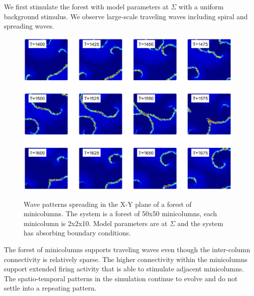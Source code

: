 We first stimulate the forest with model parameters at $\Sigma$ with a uniform background stimulus. 
We observe large-scale traveling waves including spiral and spreading waves.
\begin{figure}[!htb]
 \caption{ Wave patterns spreading in the X-Y plane of a forest of minicolumns. 
           The system is a forest of 50x50 minicolumns, each minicolumn is 2x2x10. 
           Model parameters are at $\Sigma$ and the system has absorbing boundary conditions. 
           }
   \includegraphics[width=\textwidth]{fig/Forest_SpreadingWaves_K10_Sep2p5}
   \label{fig:ForestSpiralWaves}
\end{figure}
\FloatBarrier

The forest of minicolumns supports traveling waves even though the inter-column connectivity is relatively sparse.
The higher connectivity within the minicolumns support extended firing activity that is able to stimulate adjacent minicolumns.
The spatio-temporal patterns in the simulation continue to evolve and do not settle into a repeating pattern.

